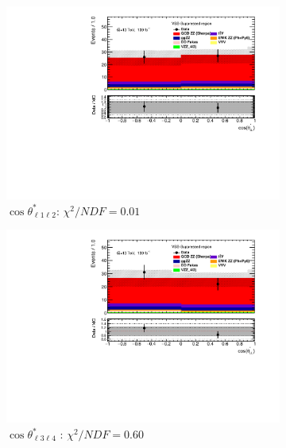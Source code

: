 \begin{figure}[!htb]
    \centering
    \begin{subfigure}{.49\textwidth}
        \centering
        \includegraphics[width=.98\linewidth]{figures/Results/RecoDist_VBSSuppressed/reco_cosThetaStar1_CR.pdf}
        \caption{ \footnotesize{$\cos \theta^{*}_{\ell 1 \ell 2}$}: $\chi^2/NDF = 0.01$ }
    \end{subfigure}
    \begin{subfigure}{.49\textwidth}
        \centering
        \includegraphics[width=.98\linewidth]{figures/Results/RecoDist_VBSSuppressed/reco_cosThetaStar3_CR.pdf}
        \caption{ \footnotesize{$\cos \theta^{*}_{\ell 3 \ell 4}$ }: $\chi^2/NDF = 0.60$ }
    \end{subfigure}\\
    \begin{subfigure}{.49\textwidth}

\end{subfigure}
\end{figure}

